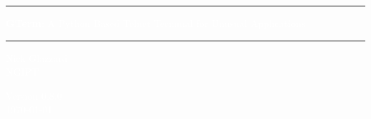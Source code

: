 \documentclass[a4paper,twoside,11pt]{article}
\begin{document}
\begin{titlepage}
\pagecolor{titlepagecolor}

\vspace*{25mm}
{\color{white} \noindent \rule{\textwidth}{3mm}}
\begin{center}
\Huge
\textcolor{white}{\textbf{GTerm}: A Python Based Telnet Terminal for Unusual Applications}
\end{center}
\vspace*{2mm}
{\color{white} \noindent \rule{\textwidth}{3mm}}

\vspace*{6cm}

\begin{center}
\Large 
\textcolor{white}{
Nick Glazzard\\
NGIPT\\
}
\end{center}

\vspace*{2cm}

\begin{center}
\Large 
\textcolor{white}{
Version 0.8.0\\
\today
}
\end{center}

\end{titlepage}

\pagecolor{white}






\end{document}
